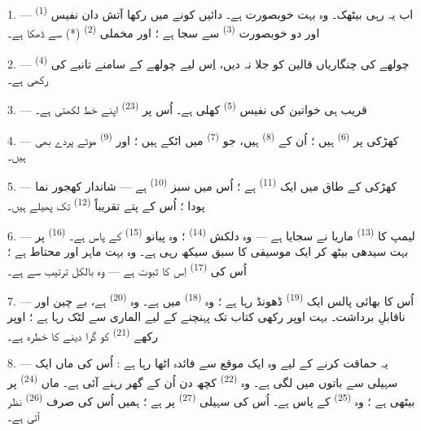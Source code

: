 1. --- اب یہ رہی بیٹھک۔ وہ بہت خوبصورت  ہے۔ دائیں کونے
میں رکھا آتش دان نفیس  \textsuperscript{(1)} اور
دو خوبصورت  \textsuperscript{(3)} سے سجا ہے ؛ اور
مخملی  \textsuperscript{(2)} (*) سے ڈھکا ہے۔

2. --- چولھے کی چنگاریاں قالین کو جلا نہ دیں، اِس لیے چولھے کے سامنے
تانبے کی  \textsuperscript{(4)} رکھی ہے۔

3. --- قریب ہی خواتین کی نفیس 
\textsuperscript{(5)} کھلی ہے۔ اُس پر 
\textsuperscript{(23)} اپنے خط لکھتی ہے۔

4. --- کھڑکی پر  \textsuperscript{(6)} ہیں ؛ اُن کے
 \textsuperscript{(8)} ہیں، جو 
\textsuperscript{(7)} میں اٹکے ہیں ؛ اور 
\textsuperscript{(9)} موٹے پردے بھی ہیں۔

5. --- کھڑکی کے طاق میں ایک 
\textsuperscript{(11)} ہے ؛ اُس میں سبز 
\textsuperscript{(10)} ہے — شاندار کھجور نما پودا ؛ اُس کے پتے
تقریباً  \textsuperscript{(12)} تک پھیلے
ہیں۔

6. --- لیمپ کا  \textsuperscript{(13)} ماریا نے
سجایا ہے — وہ دلکش  \textsuperscript{(14)} ؛ وہ
پیانو \textsuperscript{(15)} کے پاس ہے۔ 
\textsuperscript{(16)} پر بہت سیدھی بیٹھ کر ایک موسیقی کا سبق سیکھ رہی
ہے۔ وہ بہت ماہر اور محتاط ہے ؛ اُس کی 
\textsuperscript{(17)} اِس کا ثبوت ہے — وہ بالکل ترتیب سے ہے۔

\VUsaut{5.0mm}
\VUsaut{3.0mm}

7. --- اُس کا بھائی پالس ایک  \textsuperscript{(19)} ڈھونڈ
رہا ہے ؛ وہ  \textsuperscript{(18)} میں ہے۔
وہ  \textsuperscript{(20)} ہے، بے چین اور ناقابلِ
برداشت۔ بہت اوپر رکھی کتاب تک پہنچنے کے لیے الماری سے لٹک رہا ہے ؛
اوپر رکھے  \textsuperscript{(21)} کو گرا دینے کا
خطرہ ہے۔

8. --- یہ حماقت کرنے کے لیے وہ ایک موقع سے فائدہ اٹھا رہا ہے : اُس کی
ماں ایک سہیلی سے باتوں میں لگی ہے۔ وہ 
\textsuperscript{(22)} کچھ دن اُن کے گھر رہنے آئی ہے۔ ماں
 \textsuperscript{(24)} پر بیٹھی ہے ؛ وہ  \textsuperscript{(25)} کے پاس ہے۔ اُس کی سہیلی 
\textsuperscript{(27)} پر ہے ؛ ہمیں اُس کی صرف 
\textsuperscript{(26)} نظر آتی ہے۔

